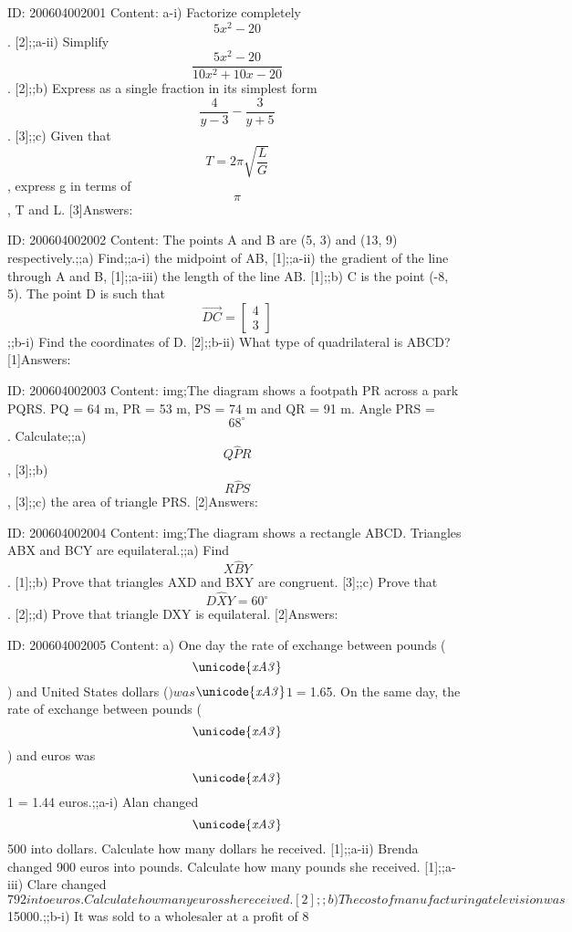 \documentclass{article}
\begin{document}
ID: 200604002001
Content:
a-i) Factorize completely $$5x^{2} -20$$. [2];;a-ii) Simplify $$\frac{5x^{2} -20}{10x^{2} +10x-20}$$. [2];;b) Express as a single fraction in its simplest form $$\frac{4}{y-3}-\frac{3}{y+5}$$. [3];;c) Given that $$T=2\pi \sqrt{ \frac{L}{G}}$$, express g in terms of $$\pi$$, T and L. [3]Answers:

ID: 200604002002
Content:
The points A and B are (5, 3) and (13, 9) respectively.;;a) Find;;a-i) the midpoint of AB, [1];;a-ii) the gradient of the line through A and B, [1];;a-iii) the length of the line AB. [1];;b) C is the point (-8, 5). The point D is such that $$\vec{DC}=\begin{bmatrix}4\\3\end{bmatrix}$$;;b-i) Find the coordinates of D. [2];;b-ii) What type of quadrilateral is ABCD? [1]Answers:

ID: 200604002003
Content:
img;The diagram shows a footpath PR across a park PQRS. PQ = 64 m, PR = 53 m, PS = 74 m and QR = 91 m. Angle PRS = $$68^{\circ}$$. Calculate;;a) $$Q \hat PR $$, [3];;b) $$R \hat PS$$, [3];;c) the area of triangle PRS. [2]Answers:

ID: 200604002004
Content:
img;The diagram shows a rectangle ABCD. Triangles ABX and BCY are equilateral.;;a) Find $$X \hat BY$$. [1];;b) Prove that triangles AXD and BXY are congruent. [3];;c) Prove that $$D \hat XY=60^{\circ}$$. [2];;d) Prove that triangle DXY is equilateral. [2]Answers:

ID: 200604002005
Content:
a) One day the rate of exchange between pounds ($$\it\unicode{xA3}$$) and United States dollars ($) was $$\it\unicode{xA3}$$1 = $1.65. On the same day, the rate of exchange between pounds ($$\it\unicode{xA3}$$) and euros was $$\it\unicode{xA3}$$1 = 1.44 euros.;;a-i) Alan changed $$\it\unicode{xA3}$$500 into dollars. Calculate how many dollars he received. [1];;a-ii) Brenda changed 900 euros into pounds. Calculate how many pounds she received. [1];;a-iii) Clare changed $792 into euros. Calculate how many euros she received. [2];;b) The cost of manufacturing a television was $15000.;;b-i) It was sold to a wholesaler at a profit of 8%
\end{document}
